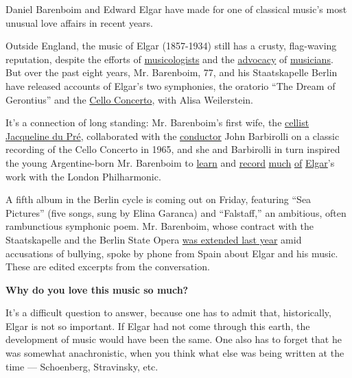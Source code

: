 Daniel Barenboim and Edward Elgar have made for one of classical music's
most unusual love affairs in recent years.

Outside England, the music of Elgar (1857-1934) still has a crusty,
flag-waving reputation, despite the efforts of
\href{https://jpehs.co.uk/introduction/publications/elgar-an-extraordinary-life/}{musicologists}
and the \href{https://www.youtube.com/watch?v=Aftq_Yrudv8}{advocacy} of
\href{https://www.nytimes3xbfgragh.onion/2017/05/09/arts/music/a-rare-performance-of-elgars-gigantic-work.html}{musicians}.
But over the past eight years, Mr. Barenboim, 77, and his Staatskapelle
Berlin have released accounts of Elgar's two symphonies, the oratorio
``The Dream of Gerontius'' and the
\href{https://www.nytimes3xbfgragh.onion/2012/10/28/arts/music/elgar-carter-cello-concertos.html}{Cello
Concerto}, with Alisa Weilerstein.

It's a connection of long standing: Mr. Barenboim's first wife, the
\href{https://www.youtube.com/watch?v=qJn86UJPmEo}{cellist Jacqueline du
Pré}, collaborated with the
\href{https://www.youtube.com/watch?v=UgtJZysa11A}{conductor} John
Barbirolli on a classic recording of the Cello Concerto in 1965, and she
and Barbirolli in turn inspired the young Argentine-born Mr. Barenboim
to
\href{https://www.nytimes3xbfgragh.onion/1975/05/16/archives/barenboim-is-fervent-in-elgars-first.html}{learn}
and \href{https://www.youtube.com/watch?v=Dzj9EXwVyz8}{record}
\href{https://www.youtube.com/watch?v=vBuDLLTCnDA}{much}
\href{https://www.youtube.com/watch?v=WYbMsJWoguU}{of}
\href{https://www.youtube.com/watch?v=cswb_WvD28k}{Elgar}'s work with
the London Philharmonic.

A fifth album in the Berlin cycle is coming out on Friday, featuring
``Sea Pictures'' (five songs, sung by Elina Garanca) and ``Falstaff,''
an ambitious, often rambunctious symphonic poem. Mr. Barenboim, whose
contract with the Staatskapelle and the Berlin State Opera
\href{https://www.nytimes3xbfgragh.onion/2019/06/04/arts/music/daniel-barenboim-staatsoper-berlin.html}{was
extended last year} amid accusations of bullying, spoke by phone from
Spain about Elgar and his music. These are edited excerpts from the
conversation.

\textbf{Why do you love this music so much?}

It's a difficult question to answer, because one has to admit that,
historically, Elgar is not so important. If Elgar had not come through
this earth, the development of music would have been the same. One also
has to forget that he was somewhat anachronistic, when you think what
else was being written at the time --- Schoenberg, Stravinsky, etc.

